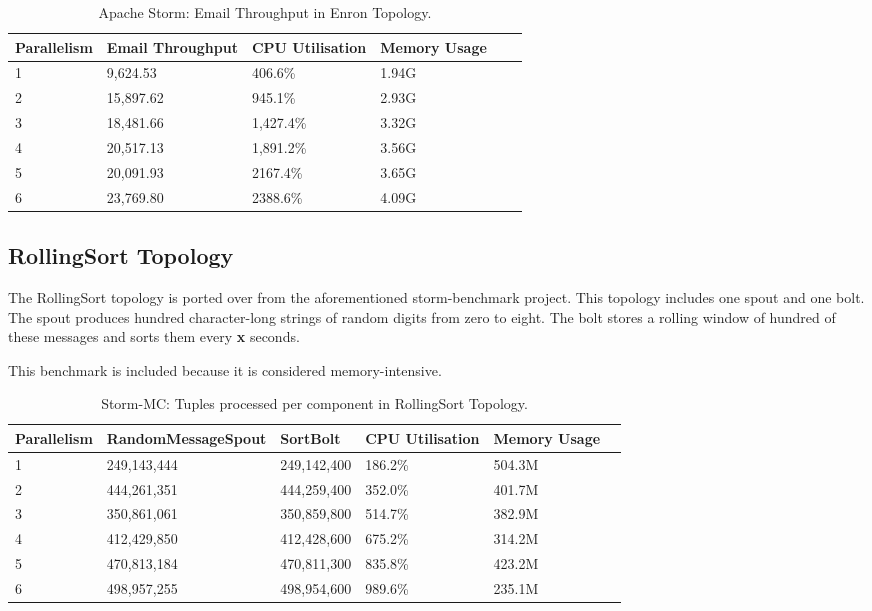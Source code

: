 \medskip
\begin{table}[!htb]
\begin{adjustwidth}{-0.5in}{-0.5in}
\centering
\small
\begin{tabular}{@{}llllll@{}}
    {Parallelism} & {Email Throughput} & {CPU Utilisation} & {Memory Usage} \\ \toprule
    1 & {9,624.53} & {406.6\%} & {1.94G} \\
    2 & {15,897.62} & {945.1\%} & {2.93G} \\
    3 & {18,481.66} & {1,427.4\%} & {3.32G} \\
    4 & {20,517.13} & {1,891.2\%} & {3.56G} \\
    5 & {20,091.93} & {2167.4\%} & {3.65G} \\
    6 & {23,769.80} & {2388.6\%} & {4.09G} \\
\end{tabular}
\caption{Apache Storm: Email Throughput in Enron Topology.}
\end{adjustwidth}
\label{table:storm_enron}
\end{table}
\medskip

\subsection{RollingSort Topology}

The RollingSort topology is ported over from the aforementioned storm-benchmark project. This topology includes one spout and one bolt. The spout produces hundred character-long strings of random digits from zero to eight. The bolt stores a rolling window of hundred of these messages and sorts them every \textbf{x} seconds.

This benchmark is included because it is considered memory-intensive.

\medskip
\begin{table}[!htb]
\begin{adjustwidth}{-0.5in}{-0.5in}
\centering
\small
\begin{tabular}{@{}llllll@{}}
    {Parallelism} & {RandomMessageSpout} & {SortBolt} & {CPU Utilisation} & {Memory Usage} \\ \toprule
    1 & {249,143,444} & {249,142,400} & {186.2\%} & {504.3M} \\
    2 & {444,261,351} & {444,259,400} & {352.0\%} & {401.7M} \\
    3 & {350,861,061} & {350,859,800} & {514.7\%} & {382.9M} \\
    4 & {412,429,850} & {412,428,600} & {675.2\%} & {314.2M} \\
    5 & {470,813,184} & {470,811,300} & {835.8\%} & {423.2M} \\
    6 & {498,957,255} & {498,954,600} & {989.6\%} & {235.1M} \\
\end{tabular}
\caption{Storm-MC: Tuples processed per component in RollingSort Topology.}
\end{adjustwidth}
\label{table:storm_mc_rolling}
\end{table}
\medskip	



